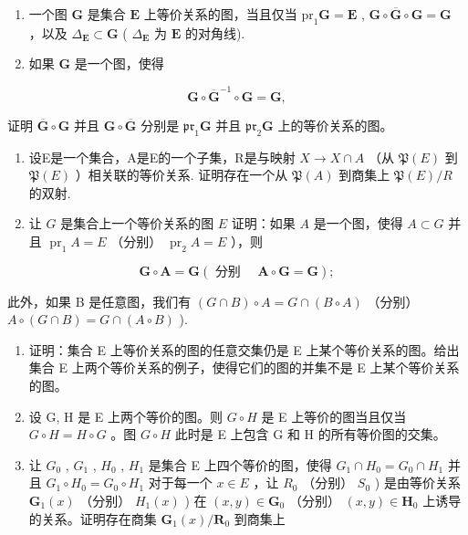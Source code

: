 \exercisegroup

\begin{enumerate}
\def\labelenumi{\arabic{enumi}.}
\item
  一个图 \(\mathbf{G}\) 是集合 \(\mathbf{E}\) 上等价关系的图，当且仅当 \(\mathrm{pr}_1\mathbf{G} = \mathbf{E}\) , \(\mathbf{G} \circ \overline{\mathbf{G}} \circ \mathbf{G} = \mathbf{G}\) ，以及 \(\Delta_{\mathbf{E}} \subset \mathbf{G}\) ( \(\Delta_{\mathbf{E}}\) 为 \(\mathbf{E}\) 的对角线).
\item
  如果 \(\mathbf{G}\) 是一个图，使得
\end{enumerate}

\[
\mathbf {G} \circ \overline {{{{\mathbf {G}}}}} ^ {- 1} \circ \mathbf {G} = \mathbf {G},
\]

证明 \(\overline{\mathbf{G}}\circ \mathbf{G}\) 并且 \(\mathbf{G}\circ \overline{\mathbf{G}}\) 分别是 \(\mathfrak{pr}_1\mathbf{G}\) 并且 \(\mathfrak{pr}_2\mathbf{G}\) 上的等价关系的图。

\begin{enumerate}
\def\labelenumi{\arabic{enumi}.}
\setcounter{enumi}{2}
\item
  设E是一个集合，A是E的一个子集，R是与映射 \(X \rightarrow X \cap A\) （从 \(\mathfrak{P}(E)\) 到 \(\mathfrak{P}(E)\) ）相关联的等价关系. 证明存在一个从 \(\mathfrak{P}(A)\) 到商集上 \(\mathfrak{P}(E)/R\) 的双射.
\item
  让 \(G\) 是集合上一个等价关系的图 \(E\) 证明：如果 \(A\) 是一个图，使得 \(A \subset G\) 并且 \(\operatorname{pr}_1 A = E\) （分别） \(\operatorname{pr}_2 A = E\) ），则
\end{enumerate}

\[
\mathbf {G} \circ \mathbf {A} = \mathbf {G} (\text { 分别 } \quad \mathbf {A} \circ \mathbf {G} = \mathbf {G});
\]

此外，如果 B 是任意图，我们有 \((G \cap B) \circ A = G \cap (B \circ A)\) （分别） \(A \circ (G \cap B) = G \cap (A \circ B)\) ).

\begin{enumerate}
\def\labelenumi{\arabic{enumi}.}
\setcounter{enumi}{4}
\item
  证明：集合 E 上等价关系的图的任意交集仍是 E 上某个等价关系的图。给出集合 E 上两个等价关系的例子，使得它们的图的并集不是 E 上某个等价关系的图。
\item
  设 G, H 是 E 上两个等价的图。则 \(G \circ H\) 是 E 上等价的图当且仅当 \(G \circ H = H \circ G\) 。图 \(G \circ H\) 此时是 E 上包含 G 和 H 的所有等价图的交集。
\item
  让 \(G_{0}\) , \(G_{1}\) , \(H_{0}\) , \(H_{1}\) 是集合 E 上四个等价的图，使得 \(G_{1} \cap H_{0} = G_{0} \cap H_{1}\) 并且 \(G_{1} \circ H_{0} = G_{0} \circ H_{1}\) 对于每一个 \(x \in E\) ，让 \(R_{0}\) （分别） \(S_{0}\) ) 是由等价关系 \(\mathbf{G}_{1}(x)\) （分别） \(H_{1}(x)\) ) 在 \((x, y) \in \mathbf{G}_{0}\) （分别） \((x, y) \in \mathbf{H}_{0}\) 上诱导的关系。证明存在商集 \(\mathbf{G}_{1}(x)/\mathbf{R}_{0}\) 到商集上
\end{enumerate}

